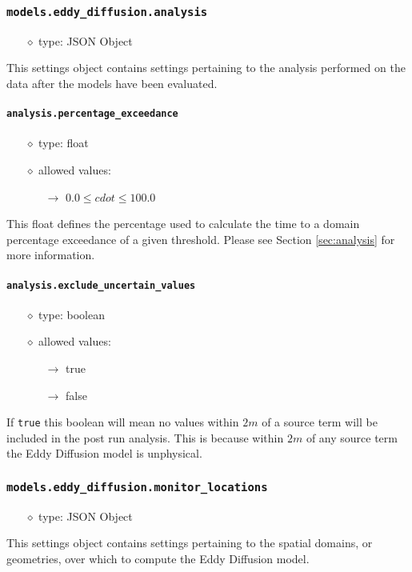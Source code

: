 \documentclass[]{article}
\def\code#1{\texttt{#1}}
\begin{document}
\subsubsection{\code{models.eddy\_diffusion.analysis}}
\begin{itemize}
    \item[$\diamond$] type: JSON Object 
\end{itemize}
This settings object contains settings pertaining to the analysis performed on
the data after the models have been evaluated.

\paragraph{\code{analysis.percentage\_exceedance}}\label{sec:percex}
\begin{itemize}
    \item[$\diamond$] type: float
    \item[$\diamond$] allowed values:
    \begin{itemize}
        \item[$\rightarrow$] $0.0\leq cdot\leq 100.0$
    \end{itemize}
\end{itemize}
This float defines the percentage used to calculate the time to a domain
percentage exceedance of a given threshold. Please see Section
\ref{sec:analysis} for more information.

\paragraph{\code{analysis.exclude\_uncertain\_values}}
\begin{itemize}
    \item[$\diamond$] type: boolean
    \item[$\diamond$] allowed values:
    \begin{itemize}
        \item[$\rightarrow$] true
        \item[$\rightarrow$] false
    \end{itemize}
\end{itemize}
If \code{true} this boolean will mean no values within $2m$ of a source term
will be included in the post run analysis. This is because within $2m$ of any
source term the Eddy Diffusion model is unphysical.

\subsubsection{\code{models.eddy\_diffusion.monitor\_locations}}
\begin{itemize}
    \item[$\diamond$] type: JSON Object 
\end{itemize}
This settings object contains settings pertaining to the spatial domains, or
geometries, over which to compute the Eddy Diffusion model.
\end{document}
